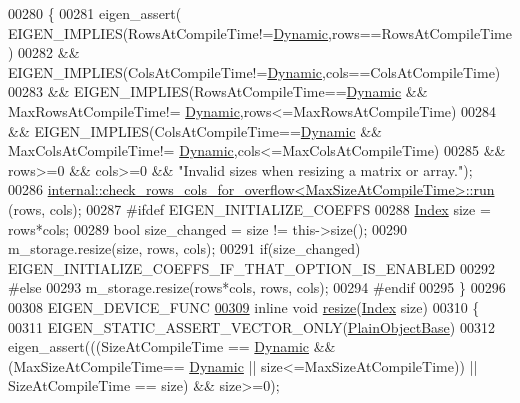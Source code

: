 \begin{DoxyCode}
00280     \{
00281       eigen\_assert(   EIGEN\_IMPLIES(RowsAtCompileTime!=\hyperlink{namespace_eigen_ad81fa7195215a0ce30017dfac309f0b2}{Dynamic},rows==RowsAtCompileTime)
00282                    && EIGEN\_IMPLIES(ColsAtCompileTime!=\hyperlink{namespace_eigen_ad81fa7195215a0ce30017dfac309f0b2}{Dynamic},cols==ColsAtCompileTime)
00283                    && EIGEN\_IMPLIES(RowsAtCompileTime==\hyperlink{namespace_eigen_ad81fa7195215a0ce30017dfac309f0b2}{Dynamic} && MaxRowsAtCompileTime!=
      \hyperlink{namespace_eigen_ad81fa7195215a0ce30017dfac309f0b2}{Dynamic},rows<=MaxRowsAtCompileTime)
00284                    && EIGEN\_IMPLIES(ColsAtCompileTime==\hyperlink{namespace_eigen_ad81fa7195215a0ce30017dfac309f0b2}{Dynamic} && MaxColsAtCompileTime!=
      \hyperlink{namespace_eigen_ad81fa7195215a0ce30017dfac309f0b2}{Dynamic},cols<=MaxColsAtCompileTime)
00285                    && rows>=0 && cols>=0 && \textcolor{stringliteral}{"Invalid sizes when resizing a matrix or array."});
00286       \hyperlink{struct_eigen_1_1internal_1_1check__rows__cols__for__overflow}{internal::check\_rows\_cols\_for\_overflow<MaxSizeAtCompileTime>::run}
      (rows, cols);
00287 \textcolor{preprocessor}{      #ifdef EIGEN\_INITIALIZE\_COEFFS}
00288         \hyperlink{namespace_eigen_a62e77e0933482dafde8fe197d9a2cfde}{Index} size = rows*cols;
00289         \textcolor{keywordtype}{bool} size\_changed = size != this->size();
00290         m\_storage.resize(size, rows, cols);
00291         \textcolor{keywordflow}{if}(size\_changed) EIGEN\_INITIALIZE\_COEFFS\_IF\_THAT\_OPTION\_IS\_ENABLED
00292 \textcolor{preprocessor}{      #else}
00293         m\_storage.resize(rows*cols, rows, cols);
00294 \textcolor{preprocessor}{      #endif}
00295     \}
00296 
00308     EIGEN\_DEVICE\_FUNC
\hyperlink{class_eigen_1_1_plain_object_base_abf8a9ec07cd52a2cdabb527596f7ddd1}{00309}     \textcolor{keyword}{inline} \textcolor{keywordtype}{void} \hyperlink{class_eigen_1_1_plain_object_base_abf8a9ec07cd52a2cdabb527596f7ddd1}{resize}(\hyperlink{namespace_eigen_a62e77e0933482dafde8fe197d9a2cfde}{Index} size)
00310     \{
00311       EIGEN\_STATIC\_ASSERT\_VECTOR\_ONLY(\hyperlink{class_eigen_1_1_plain_object_base}{PlainObjectBase})
00312       eigen\_assert(((SizeAtCompileTime == \hyperlink{namespace_eigen_ad81fa7195215a0ce30017dfac309f0b2}{Dynamic} && (MaxSizeAtCompileTime==
      \hyperlink{namespace_eigen_ad81fa7195215a0ce30017dfac309f0b2}{Dynamic} || size<=MaxSizeAtCompileTime)) || SizeAtCompileTime == size) && size>=0);

\end{DoxyCode}
